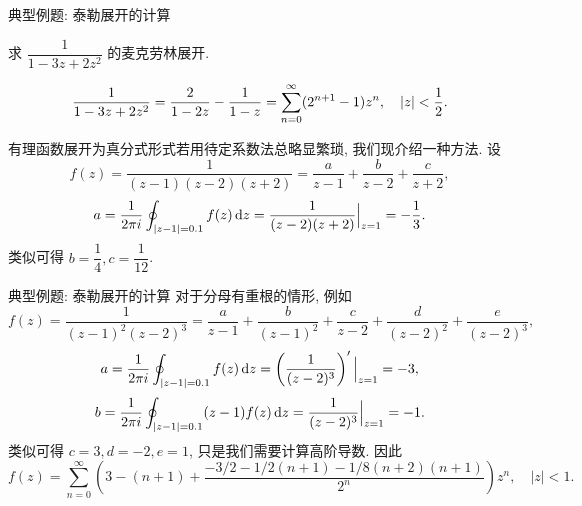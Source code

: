 \begin{frame}{典型例题: 泰勒展开的计算\noexer}
	\onslide<+->
	\begin{exercise}
		求 $\dfrac1{1-3z+2z^2}$ 的麦克劳林展开.
	\end{exercise}

	\onslide<+->
	\begin{answer}
	\[
		\frac1{1-3z+2z^2}=\frac{2}{1-2z}-\frac1{1-z}
		=\sum_{n=0}^\infty(2^{n+1}-1)z^n,\quad |z|<\frac{1}{2} .
	\]
	\end{answer}

	\onslide<+->
	有理函数展开为真分式形式若用待定系数法总略显繁琐, 我们现介绍一种方法.
	\onslide<+->
	设
	\[f(z)=\dfrac{1}{(z-1)(z-2)(z+2)}=\frac{a}{z-1}+\frac{b}{z-2}+\frac{c}{z+2},\]
	\onslide<+->
	\[a=\frac1{2\pi i} \oint_{|z-1|=0.1}f(z)\,\mathrm{d} z=\dfrac{1}{(z-2)(z+2)}\Big|_{z=1}=-\frac13.\]
	\onslide<+->
	类似可得 $b=\dfrac14,c=\dfrac1{12}$.
\end{frame}



\begin{frame}{典型例题: 泰勒展开的计算\noexer}
	\onslide<+->
	对于分母有重根的情形, 例如
	\onslide<+->
	\[f(z)=\dfrac{1}{(z-1)^2(z-2)^3}=\frac{a}{z-1}+\frac{b}{(z-1)^2}+\frac{c}{z-2}+\frac{d}{(z-2)^2}+\frac{e}{(z-2)^3},\]
	\onslide<+->
	\[a=\frac1{2\pi i} \oint_{|z-1|=0.1}f(z)\,\mathrm{d} z=\left(\dfrac{1}{(z-2)^3}\right)'\Big|_{z=1}=-3,\]
	\onslide<+->
	\[b=\frac1{2\pi i} \oint_{|z-1|=0.1}(z-1)f(z)\,\mathrm{d} z=\dfrac{1}{(z-2)^3}\Big|_{z=1}=-1.\]
	\onslide<+->
	类似可得 $c=3,d=-2,e=1$, 只是我们需要计算高阶导数.
	\onslide<+->
	因此
	\[f(z)=\sum_{n=0}^\infty\left(3-(n+1)+\frac{-3/2-1/2(n+1)-1/8(n+2)(n+1)}{2^n}\right)z^n,\quad |z|<1.\]
\end{frame}

